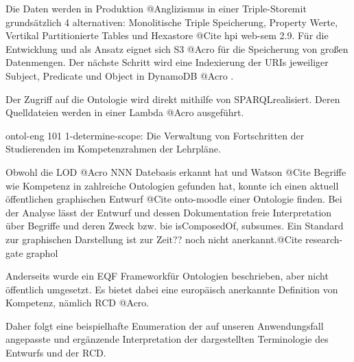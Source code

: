 \documentclass[
12pt,
english,
ngerman,
headsepline,
twoside,
openright,
numbers=noenddot,version=first
]{scrreprt}
\begin{document}
Die Daten werden in Produktion @Anglizismus in einer \glqq Triple-Store\grqq mit grundsätzlich 4 alternativen: Monolitische Triple Speicherung, Property Werte, Vertikal Partitionierte Tables und Hexastore @Cite hpi web-sem 2.9. 
Für die Entwicklung und als Ansatz eignet sich S3 @Acro für die Speicherung von großen Datenmengen. Der nächste Schritt wird eine Indexierung der URIs jeweiliger Subject, Predicate und Object in DynamoDB @Acro .

Der Zugriff auf die Ontologie wird direkt mithilfe von \glqq SPARQL\grqq  realisiert. Deren Quelldateien werden in einer Lambda @Acro ausgeführt.

ontol-eng 101
1-determine-scope: 
Die Verwaltung von Fortschritten der Studierenden im Kompetenzrahmen der Lehrpläne.

Obwohl die LOD @Acro NNN Datebasis erkannt hat und Watson @Cite Begriffe wie Kompetenz in zahlreiche Ontologien gefunden hat, konnte ich einen aktuell öffentlichen graphischen Entwurf\cite{OntoMoodle} @Cite onto-moodle einer Ontologie finden. 
Bei der Analyse lässt der Entwurf und dessen Dokumentation freie Interpretation über Begriffe und deren Zweck bzw. bie \glqq isComposedOf\grqq, \glqq subsumes\grqq. Ein Standard zur graphischen Darstellung ist zur Zeit?? noch nicht anerkannt.@Cite research-gate graphol

Anderseits wurde ein \glqq EQF Framework\grqq für Ontologien beschrieben, aber nicht öffentlich umgesetzt. Es bietet dabei eine europäisch anerkannte Definition von Kompetenz, nämlich RCD @Acro.

Daher folgt eine beispielhafte Enumeration der auf unseren Anwendungsfall angepasste und ergänzende Interpretation der dargestellten Terminologie des Entwurfs und der RCD.
\end{document}
